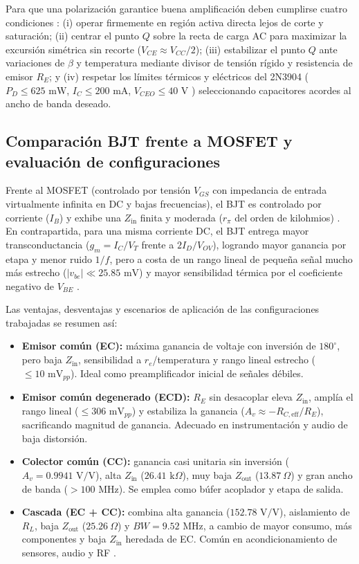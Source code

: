 \documentclass[conference]{IEEEtran}
\begin{document}
Para que una polarizaci\'on garantice buena amplificaci\'on deben cumplirse cuatro condiciones \cite{sedra2020,horowitz2015}: (i) operar firmemente en regi\'on activa directa lejos de corte y saturaci\'on; (ii) centrar el punto $Q$ sobre la recta de carga AC para maximizar la excursi\'on sim\'etrica sin recorte ($V_{CE} \approx V_{CC}/2$); (iii) estabilizar el punto $Q$ ante variaciones de $\beta$ y temperatura mediante divisor de tensi\'on r\'igido y resistencia de emisor $R_E$; y (iv) respetar los l\'imites t\'ermicos y el\'ectricos del 2N3904 ($P_D \le 625\text{ mW}$, $I_C \le 200\text{ mA}$, $V_{CEO} \le 40\text{ V}$ \cite{onsemi2021}) seleccionando capacitores acordes al ancho de banda deseado.

\subsection{Comparaci\'on BJT frente a MOSFET y evaluaci\'on de configuraciones}

Frente al MOSFET (controlado por tensi\'on $V_{GS}$ con impedancia de entrada virtualmente infinita en DC y bajas frecuencias), el BJT es controlado por corriente ($I_B$) y exhibe una $Z_{\mathrm{in}}$ finita y moderada ($r_\pi$ del orden de kilohmios) \cite{sedra2020}. En contrapartida, para una misma corriente DC, el BJT entrega mayor transconductancia ($g_m = I_C/V_T$ frente a $2I_D/V_{OV}$), logrando mayor ganancia por etapa y menor ruido $1/f$, pero a costa de un rango lineal de peque\~na se\~nal mucho m\'as estrecho ($|v_{be}| \ll 25.85\text{ mV}$) y mayor sensibilidad t\'ermica por el coeficiente negativo de $V_{BE}$ \cite{sedra2020,horowitz2015}.

Las ventajas, desventajas y escenarios de aplicaci\'on de las configuraciones trabajadas se resumen as\'i:
\begin{itemize}
\item \textbf{Emisor com\'un (EC):} m\'axima ganancia de voltaje con inversi\'on de $180^\circ$, pero baja $Z_{\mathrm{in}}$, sensibilidad a $r_e$/temperatura y rango lineal estrecho ($\le 10\text{ mV}_{pp}$). Ideal como preamplificador inicial de se\~nales d\'ebiles.
\item \textbf{Emisor com\'un degenerado (ECD):} $R_E$ sin desacoplar eleva $Z_{\mathrm{in}}$, ampl\'ia el rango lineal ($\le 306\text{ mV}_{pp}$) y estabiliza la ganancia ($A_v \approx -R_{C,\mathrm{eff}}/R_E$), sacrificando magnitud de ganancia. Adecuado en instrumentaci\'on y audio de baja distorsi\'on.
\item \textbf{Colector com\'un (CC):} ganancia casi unitaria sin inversi\'on ($A_v = 0.9941\text{ V/V}$), alta $Z_{\mathrm{in}}$ ($26.41\text{ k}\Omega$), muy baja $Z_{\mathrm{out}}$ ($13.87\ \Omega$) y gran ancho de banda ($>100\text{ MHz}$). Se emplea como b\'ufer acoplador y etapa de salida.
\item \textbf{Cascada (EC + CC):} combina alta ganancia ($152.78\text{ V/V}$), aislamiento de $R_L$, baja $Z_{\mathrm{out}}$ ($25.26\ \Omega$) y $BW = 9.52\text{ MHz}$, a cambio de mayor consumo, m\'as componentes y baja $Z_{\mathrm{in}}$ heredada de EC. Com\'un en acondicionamiento de sensores, audio y RF \cite{razavi2012,horowitz2015}.
\end{itemize}
\end{document}
